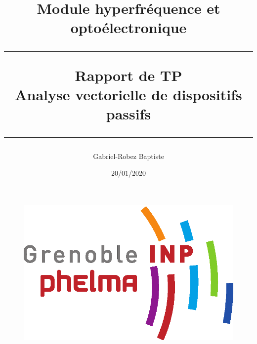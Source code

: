 \documentclass{article}
\title{Module hyperfréquence et optoélectronique \\ \bigskip \bigskip \hrule width 16.5cm \bigskip \textbf{Rapport de TP \\ Analyse vectorielle de dispositifs passifs \\} \bigskip \hrule width 16.5cm}
\author{Gabriel-Robez Baptiste}
\date{20/01/2020}
\begin{document}
\maketitle

\renewcommand{\contentsname}{Sommaire}  %
\tableofcontents

\bigskip

\begin{figure}[!ht]
\centering
\includegraphics[scale=0.15]{logo_phelma.png}
\end{figure}
\clearpage
\end{document}
